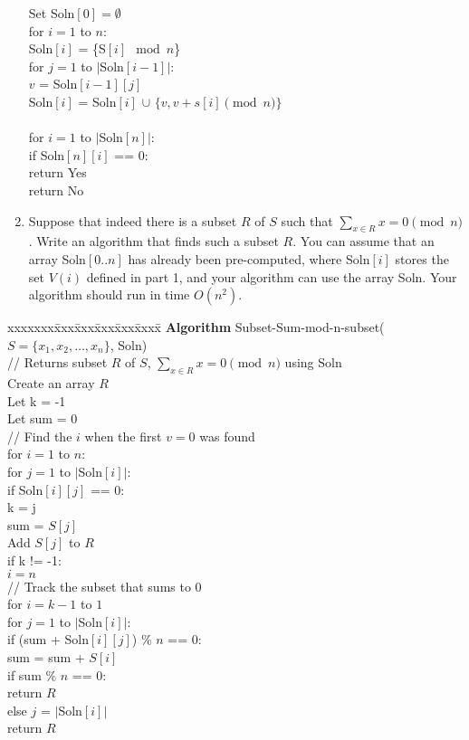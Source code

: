 \documentclass[11pt]{article}
\def\question#1{\red{#1}}
\def\soln#1{\par\blu{#1}} %
\def\blu#1{{\color{blu}#1}}
\def\red#1{{\color{red}#1}}
\begin{document}
\begin{enumerate}
{\begin{tabbing}
\>\> Set Soln$[0] = \emptyset$ \\
\>\> for $i = 1$ to $n$: \\
\>\>\> Soln$[i]$ = \{S$[i] \mod n$\} \\
\>\>\> for $j = 1$ to $|$Soln$[i-1]|$: \\
\>\>\>\> $v$ = Soln$[i-1][j]$ \\
\>\>\>\> Soln$[i]$ = Soln$[i]$ $\cup$ $\{v, v+s[i] \pmod n\}$ \\ \\
\>\> for $i = 1$ to $|$Soln$[n]|$: \\
\>\>\> if Soln$[n][i]$ == 0: \\
\>\>\>\> return Yes \\
\>\> return No \\
\end{tabbing}
}
\item Suppose that indeed there is a subset $R$ of $S$ such that $\sum_{x
   \in R} x = 0 \pmod n$.  \question{Write an algorithm that finds such a subset
$R$}.  You can assume that an array Soln$[0..n]$ has already been
pre-computed, where Soln$[i]$ stores the set $V(i)$ defined in part 1,
and your algorithm can use the array Soln. Your algorithm should
run in time $O(n^2)$.
\end{enumerate}
\soln{
\begin{tabbing}
xxxxxxx\=xxx\=xxx\=xxx\=xxx\=xxxx\= \kill
\> {\bf Algorithm} Subset-Sum-mod-n-subset($S = \{x_1,x_2,\ldots,x_n\}$, Soln) \\
\>\> // Returns subset $R$ of $S$, $\sum_{x \in R} x = 0 \pmod n$ using Soln  \\
\>\> Create an array $R$ \\
\>\> Let k = -1 \\
\>\> Let sum = 0 \\
\>\> // Find the $i$ when the first $v = 0$ was found \\
\>\> for $i = 1$ to $n$: \\
\>\>\> for $j = 1$ to $|$Soln$[i]|$: \\
\>\>\>\> if Soln$[i][j]$ == 0: \\
\>\>\>\>\> k = j \\
\>\>\>\>\> sum = $S[j]$ \\
\>\>\>\>\> Add $S[j]$ to $R$ \\
\>\>\> if k != -1: \\
\>\>\>\> $i = n$ \\
\>\> // Track the subset that sums to 0 \\
\>\> for $i = k - 1$ to $1$ \\
\>\>\> for $j = 1$ to $|$Soln$[i]|$: \\
\>\>\>\> if (sum + Soln$[i][j]$) \% $n$ == 0: \\
\>\>\>\>\> sum = sum + $S[i]$ \\
\>\>\>\>\> if sum \% $n$ == 0: \\
\>\>\>\>\>\> return $R$ \\
\>\>\>\>\> else $j$ = $|$Soln$[i]|$ \\
\>\> return $R$ \\
\end{tabbing}
}
\end{document}
